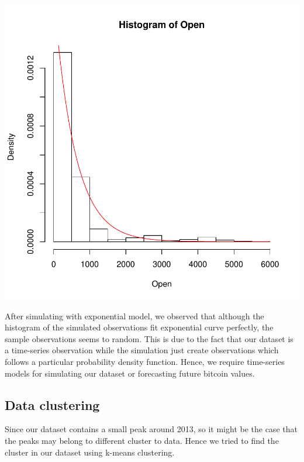\documentclass{article}
\begin{document}
\begin{Schunk}
\end{Schunk}
\includegraphics{Report-006}

After simulating with exponential model, we observed that although the histogram of the simulated observations fit exponential curve perfectly, the sample observations seems to random. This is due to the fact that our dataset is a time-series observation while the simulation just create observations which follows a particular probability density function. Hence, we require time-series models for simulating our dataset or forecasting future bitcoin values.

\subsection{Data clustering}
Since our dataset contains a small peak around 2013, so it might be the case that the peaks may belong to different cluster to data. Hence we tried to find the cluster in our dataset using k-means clustering.
\end{document}
